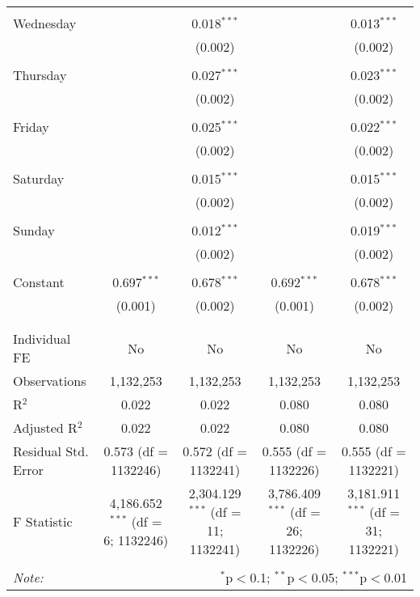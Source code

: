 \documentclass[
]{article}
\begin{document}
\begin{table}[!htbp]
{\begin{tabular}{@{\extracolsep{5pt}}lcccc}
  & & & & \\ 
 Wednesday &  & 0.018$^{***}$ &  & 0.013$^{***}$ \\ 
  &  & (0.002) &  & (0.002) \\ 
  & & & & \\ 
 Thursday &  & 0.027$^{***}$ &  & 0.023$^{***}$ \\ 
  &  & (0.002) &  & (0.002) \\ 
  & & & & \\ 
 Friday &  & 0.025$^{***}$ &  & 0.022$^{***}$ \\ 
  &  & (0.002) &  & (0.002) \\ 
  & & & & \\ 
 Saturday &  & 0.015$^{***}$ &  & 0.015$^{***}$ \\ 
  &  & (0.002) &  & (0.002) \\ 
  & & & & \\ 
 Sunday &  & 0.012$^{***}$ &  & 0.019$^{***}$ \\ 
  &  & (0.002) &  & (0.002) \\ 
  & & & & \\ 
 Constant & 0.697$^{***}$ & 0.678$^{***}$ & 0.692$^{***}$ & 0.678$^{***}$ \\ 
  & (0.001) & (0.002) & (0.001) & (0.002) \\ 
  & & & & \\ 
\hline \\[-1.8ex] 
Individual FE & No & No & No & No \\ 
Observations & 1,132,253 & 1,132,253 & 1,132,253 & 1,132,253 \\ 
R$^{2}$ & 0.022 & 0.022 & 0.080 & 0.080 \\ 
Adjusted R$^{2}$ & 0.022 & 0.022 & 0.080 & 0.080 \\ 
Residual Std. Error & 0.573 (df = 1132246) & 0.572 (df = 1132241) & 0.555 (df = 1132226) & 0.555 (df = 1132221) \\ 
F Statistic & 4,186.652$^{***}$ (df = 6; 1132246) & 2,304.129$^{***}$ (df = 11; 1132241) & 3,786.409$^{***}$ (df = 26; 1132226) & 3,181.911$^{***}$ (df = 31; 1132221) \\ 
\hline 
\hline \\[-1.8ex] 
\textit{Note:}  & \multicolumn{4}{r}{$^{*}$p$<$0.1; $^{**}$p$<$0.05; $^{***}$p$<$0.01} \\ 
\end{tabular}
} 
\end{table} 
\newpage
\end{document}
